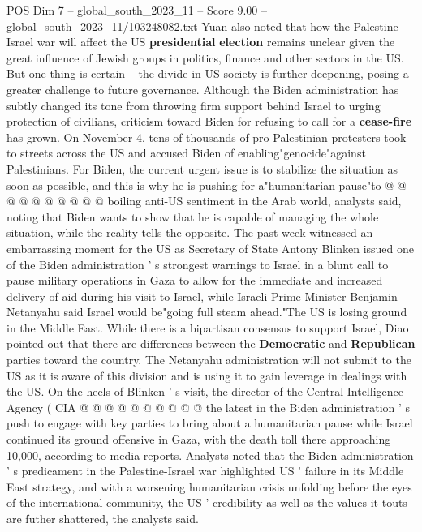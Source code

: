 \begin{textsample}{POS Dim 7 – global\_south\_2023\_11 – Score 9.00 – global\_south\_2023\_11/103248082.txt}
Yuan also noted that how the Palestine-Israel war will affect the US \textbf{presidential} \textbf{election} remains unclear given the great influence of Jewish groups in politics, finance and other sectors in the US.
But one thing is certain -- the divide in US society is further deepening, posing a greater challenge to future governance.
Although the Biden administration has subtly changed its tone from throwing firm support behind Israel to urging protection of civilians, criticism toward Biden for refusing to call for a \textbf{cease-fire} has grown.
On November 4, tens of thousands of pro-Palestinian protesters took to streets across the US and accused Biden of enabling"genocide"against Palestinians.
For Biden, the current urgent issue is to stabilize the situation as soon as possible, and this is why he is pushing for a"humanitarian pause"to @ @ @ @ @ @ @ @ @ @ boiling anti-US sentiment in the Arab world, analysts said, noting that Biden wants to show that he is capable of managing the whole situation, while the reality tells the opposite.
The past week witnessed an embarrassing moment for the US as Secretary of State Antony Blinken issued one of the Biden administration ' s strongest warnings to Israel in a blunt call to pause military operations in Gaza to allow for the immediate and increased delivery of aid during his visit to Israel, while Israeli Prime Minister Benjamin Netanyahu said Israel would be"going full steam ahead."The US is losing ground in the Middle East.
While there is a bipartisan consensus to support Israel, Diao pointed out that there are differences between the \textbf{Democratic} and \textbf{Republican} parties toward the country.
The Netanyahu administration will not submit to the US as it is aware of this division and is using it to gain leverage in dealings with the US.
On the heels of Blinken ' s visit, the director of the Central Intelligence Agency ( CIA @ @ @ @ @ @ @ @ @ @ the latest in the Biden administration ' s push to engage with key parties to bring about a humanitarian pause while Israel continued its ground offensive in Gaza, with the death toll there approaching 10,000, according to media reports.
Analysts noted that the Biden administration ' s predicament in the Palestine-Israel war highlighted US ' failure in its Middle East strategy, and with a worsening humanitarian crisis unfolding before the eyes of the international community, the US ' credibility as well as the values it touts are futher shattered, the analysts said.

\end{textsample}
